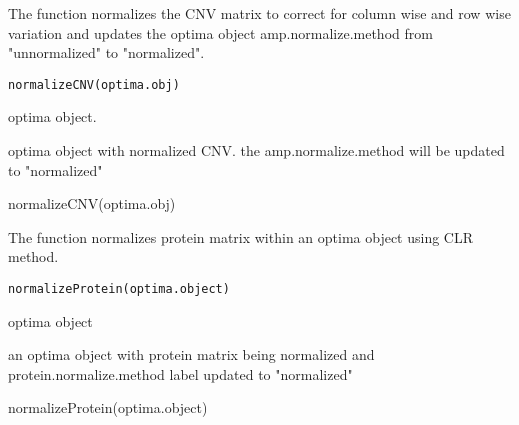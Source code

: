 \documentclass[a4paper]{book}
\begin{document}
%
\begin{Description}\relax
The function normalizes the CNV matrix to correct for column wise and row wise variation and
updates the optima object amp.normalize.method from "unnormalized" to "normalized".
\end{Description}
%
\begin{Usage}
\begin{verbatim}
normalizeCNV(optima.obj)
\end{verbatim}
\end{Usage}
%
\begin{Arguments}
\begin{ldescription}
\item[\code{optima.obj}] optima object.
\end{ldescription}
\end{Arguments}
%
\begin{Value}
optima object with normalized CNV. the amp.normalize.method will be updated to "normalized"
\end{Value}
%
\begin{Examples}
\begin{ExampleCode}
normalizeCNV(optima.obj)
\end{ExampleCode}
\end{Examples}
%
\begin{Description}\relax
The function normalizes protein matrix within an optima object using
CLR method.
\end{Description}
%
\begin{Usage}
\begin{verbatim}
normalizeProtein(optima.object)
\end{verbatim}
\end{Usage}
%
\begin{Arguments}
\begin{ldescription}
\item[\code{optima.obj}] optima object
\end{ldescription}
\end{Arguments}
%
\begin{Value}
an optima object with protein matrix being normalized and
protein.normalize.method label updated to "normalized"
\end{Value}
%
\begin{Examples}
\begin{ExampleCode}
normalizeProtein(optima.object)
\end{ExampleCode}
\end{Examples}
\end{document}
